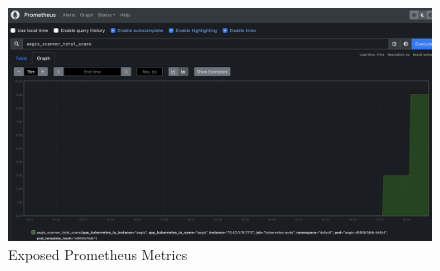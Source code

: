 \documentclass[12pt, conference, final, a4paper, onecolumn, compsoc]{IEEEtran}
\begin{document}


\begin{figure}[H]
  \centering \includegraphics[scale=0.31]{images/prometheus-metrics.png}
  \caption{Exposed Prometheus Metrics}
  \label{appendix:prometheus-metrics}
\end{figure}







\bigskip


 
\end{document}

